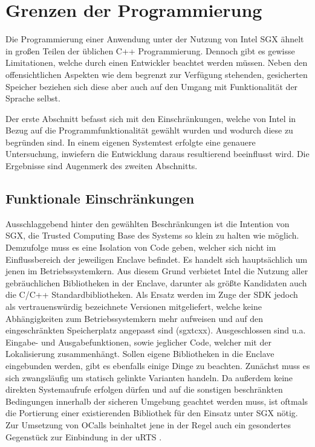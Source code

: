 \section{Grenzen der Programmierung}

Die Programmierung einer Anwendung unter der Nutzung von Intel \ac{SGX} ähnelt in großen Teilen der üblichen C++ Programmierung. Dennoch gibt es gewisse Limitationen, welche durch einen Entwickler beachtet werden müssen. Neben den offensichtlichen Aspekten wie dem begrenzt zur Verfügung stehenden, gesicherten Speicher beziehen sich diese aber auch auf den Umgang mit Funktionalität der Sprache selbst. 

Der erste Abschnitt befasst sich mit den Einschränkungen, welche von Intel in Bezug auf die Programmfunktionalität gewählt wurden und wodurch diese zu begründen sind. In einem eigenen Systemtest erfolgte eine genauere Untersuchung, inwiefern die Entwicklung daraus resultierend beeinflusst wird. Die Ergebnisse sind Augenmerk des zweiten Abschnitts.

\subsection{Funktionale Einschränkungen}

Ausschlaggebend hinter den gewählten Beschränkungen ist die Intention von \ac{SGX}, die Trusted Computing Base des Systems so klein zu halten wie möglich. Demzufolge muss es eine Isolation von Code geben, welcher sich nicht im Einflussbereich der jeweiligen Enclave befindet. Es handelt sich hauptsächlich um jenen im Betriebssystemkern. Aus diesem Grund verbietet Intel die Nutzung aller gebräuchlichen Bibliotheken in der Enclave, darunter als größte Kandidaten auch die C/C++ Standardbibliotheken. Als Ersatz werden im Zuge der \ac{SDK} jedoch als vertrauenswürdig bezeichnete Versionen mitgeliefert, welche keine Abhängigkeiten zum Betriebssystemkern mehr aufweisen und auf den eingeschränkten Speicherplatz angepasst sind (sgx\textunderscore tcxx). Ausgeschlossen sind u.a. Eingabe- und Ausgabefunktionen, sowie jeglicher Code, welcher mit der Lokalisierung zusammenhängt. Sollen eigene Bibliotheken in die Enclave eingebunden werden, gibt es ebenfalls einige Dinge zu beachten. Zunächst muss es sich zwangsläufig um statisch gelinkte Varianten handeln. Da außerdem keine direkten Systemaufrufe erfolgen dürfen und auf die sonstigen beschränkten Bedingungen innerhalb der sicheren Umgebung geachtet werden muss, ist oftmals die Portierung einer existierenden Bibliothek für den Einsatz unter \ac{SGX} nötig. Zur Umsetzung von \acp{OCall} beinhaltet jene in der Regel auch ein gesondertes Gegenstück zur Einbindung in der \ac{uRTS} \cite{LinuxGuide}.
 
